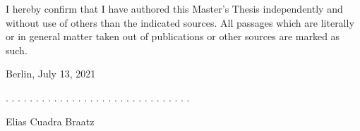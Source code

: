 \documentclass[a4paper,11pt]{article}
\newcommand{\thesistype}{Master's Thesis}
\newcommand{\thesisauthor}{Elias Cuadra Braatz}
\newcommand{\thesisdate}{July 13, 2021}
\begin{document}
I hereby confirm that I have authored this \thesistype{} independently and
without use of others than the indicated sources. All passages which are
literally or in general matter taken out of publications or other sources are
marked as such.
\vspace{1cm}

Berlin, \thesisdate{}
\vspace{3cm}

. . . . . . . . . . . . . . . . . . . . . . . . . . . . . . .
\vspace{0.1cm}

\thesisauthor{}
\end{document}
